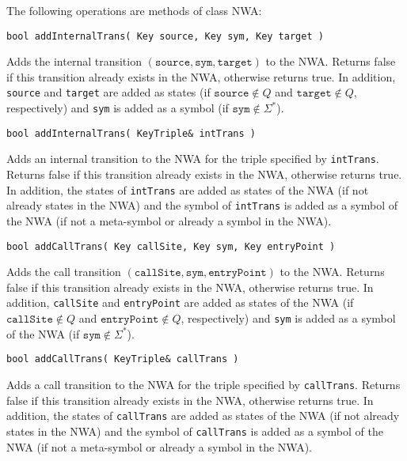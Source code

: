 \clearpage

\noindent The following operations are methods of class NWA:

\begin{description}

  \item\texttt{bool addInternalTrans( Key source, Key sym, Key target )} \nopagebreak

    Adds the internal transition
    $(\texttt{source},\texttt{sym},\texttt{target})$ to the NWA.  Returns
    false if this transition already exists in the NWA, otherwise returns
    true.  In addition, \texttt{source} and \texttt{target} are added as
    states (if $\texttt{source} \not\in Q$ and $\texttt{target} \not\in Q$,
    respectively) and \texttt{sym} is added as a symbol (if $\texttt{sym}
    \not\in \Sigma^*$).

  \item\texttt{bool addInternalTrans( KeyTriple\& intTrans )} \nopagebreak

    Adds an internal transition to the NWA for the triple specified by
    \texttt{intTrans}.  Returns false if this transition already exists in
    the NWA, otherwise returns true.  In addition, the states of
    \texttt{intTrans} are added as states of the NWA (if not already states
    in the NWA) and the symbol of \texttt{intTrans} is added as a symbol of
    the NWA (if not a meta-symbol or already a symbol in the NWA).

  \item\texttt{bool addCallTrans( Key callSite, Key sym, Key entryPoint )} \nopagebreak

    Adds the call transition
    $(\texttt{callSite},\texttt{sym},\texttt{entryPoint})$ to the NWA.
    Returns false if this transition already exists in the NWA, otherwise
    returns true.  In addition, \texttt{callSite} and \texttt{entryPoint} are
    added as states of the NWA (if $\texttt{callSite} \not\in Q$ and
    $\texttt{entryPoint} \not\in Q$, respectively) and \texttt{sym} is added
    as a symbol of the NWA (if $\texttt{sym} \not\in \Sigma^*$).

  \item\texttt{bool addCallTrans( KeyTriple\& callTrans )} \nopagebreak

    Adds a call transition to the NWA for the triple specified by
    \texttt{callTrans}.  Returns false if this transition already exists in
    the NWA, otherwise returns true.  In addition, the states of
    \texttt{callTrans} are added as states of the NWA (if not already states
    in the NWA) and the symbol of \texttt{callTrans} is added as a symbol of
    the NWA (if not a meta-symbol or already a symbol in the NWA).


\end{description}
